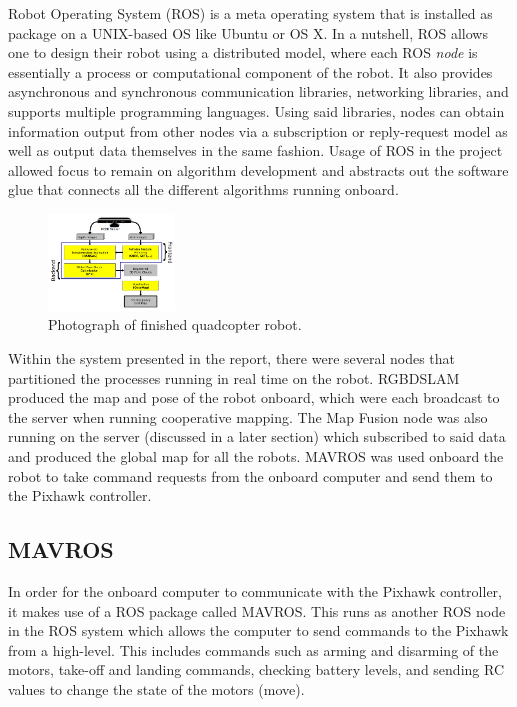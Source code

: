 \documentclass[letterpaper, oneside, 10pt]{report}
\begin{document}
Robot Operating System (ROS) is a meta operating system that is installed as package on a UNIX-based OS like Ubuntu or OS X. In a nutshell, ROS allows one to design their robot using a distributed model, where each ROS \textsl{node} is essentially a process or computational component of the robot. It also provides asynchronous and synchronous communication libraries, networking libraries, and supports multiple programming languages. Using said libraries, nodes can obtain information output from other nodes via a subscription or reply-request model as well as output  data themselves in the same fashion. Usage of ROS in the project allowed focus to remain on algorithm development and abstracts out the software glue that connects all the different algorithms running onboard.

\begin{figure}[h!]
 \caption{Photograph of finished quadcopter robot.}
 \centering
   \includegraphics[width=0.3\textwidth]{images/rgbdslam}
\end{figure}

Within the system presented in the report, there were several nodes that partitioned the processes running in real time on the robot. RGBDSLAM produced the map and pose of the robot onboard, which were each broadcast to the server when running cooperative mapping. The Map Fusion node was also running on the server (discussed in a later section) which subscribed to said data and produced the global map for all the robots. MAVROS was used onboard the robot to take command requests from the onboard computer and send them to the Pixhawk controller.

\subsection{MAVROS}

In order for the onboard computer to communicate with the Pixhawk controller, it makes use of a ROS package called MAVROS. This runs as another ROS node in the ROS system which allows the computer to send commands to the Pixhawk from a high-level. This includes commands such as arming and disarming of the motors, take-off and landing commands, checking battery levels, and sending RC values to change the state of the motors (move).
\end{document}
